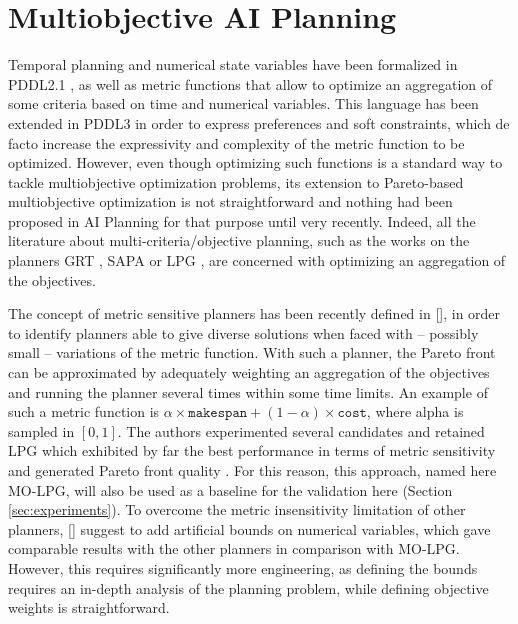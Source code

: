 \documentclass[letterpaper]{article}
\newcommand{\MOLPG}{{\sc MO-LPG}}
\begin{document}
\section{Multiobjective AI Planning}
\label{sec:multi-planning}

Temporal planning and numerical state variables have been formalized in PDDL2.1 \cite{PDDL2}, as well as metric functions that allow to optimize an aggregation of some criteria based on time and numerical variables. This language has been extended  in PDDL3 \cite{gerevini2006preferences} in order to express preferences and soft constraints, which de facto increase the expressivity and complexity of the metric function to be optimized. However, even though optimizing such functions is a standard way to tackle multiobjective optimization problems, its extension to Pareto-based multiobjective optimization is not straightforward and nothing had been proposed in AI Planning for that purpose until very recently. Indeed, all the literature about multi-criteria/objective planning, such as the works on the planners GRT \cite{Refanidis03}, SAPA \cite{Do2003sapa} or LPG \cite{gerevini2008}, are concerned with optimizing an aggregation of the objectives.

The concept of metric sensitive planners has been recently defined in \citeauthor{LPG-STAIRS2012} [\citeyear{LPG-STAIRS2012}], in order to identify planners able to give diverse solutions when faced with -- possibly small -- variations of the metric function. With such a planner, the Pareto front can be approximated by adequately weighting an aggregation of the objectives and running the planner several times within some time limits. An example of such a metric function is $\alpha\times\mathtt{makespan}+(1-\alpha)\times\mathtt{cost}$, where alpha is sampled in $[0,1]$. The authors experimented several candidates and retained LPG which exhibited by far the best performance in terms of metric sensitivity and generated Pareto front quality \cite{LPG-PlanSIG2012}. 
For this reason, this approach, named here \MOLPG, will also be used as a baseline for the validation here (Section \ref{sec:experiments}). To overcome the metric insensitivity 
limitation of other planners, \citeauthor{LPG-STAIRS2012} [\citeyear{LPG-STAIRS2012}] suggest to add artificial bounds on numerical variables, which gave comparable results with the other 
planners in comparison with \MOLPG. However, this requires significantly more engineering, as defining the bounds requires an in-depth analysis of the planning problem, while defining objective weights is straightforward.
\end{document}
